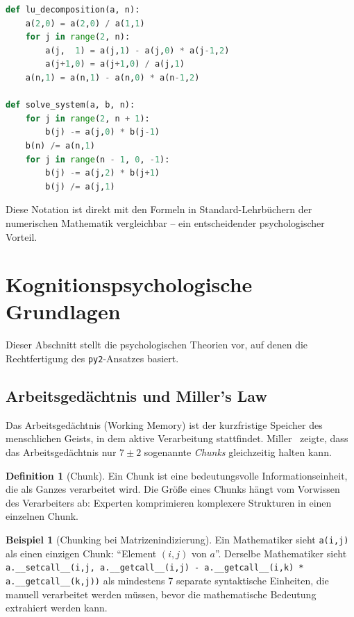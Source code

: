 \documentclass[a4paper,12pt]{article}
\theoremstyle{definition}
\newtheorem{definition}{Definition}
\newtheorem{beispiel}{Beispiel}
\begin{document}
\begin{lstlisting}[language=Python, caption={Crout-LU-Zerlegung in py2-Syntax -- mathematisch transparent}]
def lu_decomposition(a, n):
    a(2,0) = a(2,0) / a(1,1)
    for j in range(2, n):
        a(j,  1) = a(j,1) - a(j,0) * a(j-1,2)
        a(j+1,0) = a(j+1,0) / a(j,1)
    a(n,1) = a(n,1) - a(n,0) * a(n-1,2)

def solve_system(a, b, n):
    for j in range(2, n + 1):
        b(j) -= a(j,0) * b(j-1)
    b(n) /= a(n,1)
    for j in range(n - 1, 0, -1):
        b(j) -= a(j,2) * b(j+1)
        b(j) /= a(j,1)
\end{lstlisting}

Diese Notation ist direkt mit den Formeln in Standard-Lehrb\"uchern der numerischen
Mathematik vergleichbar -- ein entscheidender psychologischer Vorteil.

\section{Kognitionspsychologische Grundlagen}

Dieser Abschnitt stellt die psychologischen Theorien vor, auf denen die Rechtfertigung
des \texttt{py2}-Ansatzes basiert.

\subsection{Arbeitsged\"achtnis und Miller's Law}

Das Arbeitsged\"achtnis (Working Memory) ist der kurzfristige Speicher des menschlichen
Geists, in dem aktive Verarbeitung stattfindet. Miller~\cite{miller1956} zeigte, dass
das Arbeitsged\"achtnis nur $7 \pm 2$ sogenannte \emph{Chunks} gleichzeitig halten kann.

\begin{definition}[Chunk]
	Ein Chunk ist eine bedeutungsvolle Informationseinheit, die als Ganzes verarbeitet
	wird. Die Gr\"o\ss{}e eines Chunks h\"angt vom Vorwissen des Verarbeiters ab:
	Experten komprimieren komplexere Strukturen in einen einzelnen Chunk.
\end{definition}

\begin{beispiel}[Chunking bei Matrizenindizierung]
	Ein Mathematiker sieht \texttt{a(i,j)} als einen einzigen Chunk: ``Element $(i,j)$
	von $a$''. Derselbe Mathematiker sieht \texttt{a.\_\_setcall\_\_(i,j, a.\_\_getcall\_\_(i,j)
	- a.\_\_getcall\_\_(i,k) * a.\_\_getcall\_\_(k,j))} als mindestens 7 separate syntaktische
	Einheiten, die manuell verarbeitet werden m\"ussen, bevor die mathematische Bedeutung
	extrahiert werden kann.
\end{beispiel}
\end{document}
